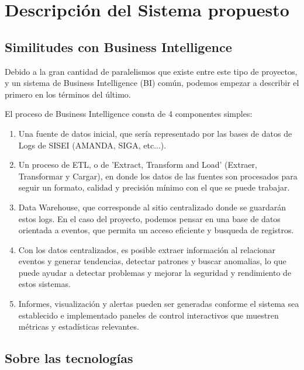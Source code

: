 \section{Descripción del Sistema propuesto}
\label{section:descripcion}

\subsection{Similitudes con Business Intelligence}

Debido a la gran cantidad de paralelismos que existe entre este tipo de proyectos, y un sistema de Business Intelligence (BI) común, podemos empezar a describir el primero en los términos del último.


El proceso de Business Intelligence consta de 4 componentes simples:

\begin{enumerate}
  \item Una fuente de datos inicial, que sería representado por las bases de datos de Logs de SISEI (AMANDA, SIGA, etc...).
  \item Un proceso de ETL, o de 'Extract, Transform and Load' (Extraer, Transformar y Cargar), en donde los datos de las fuentes son procesados para seguir un formato, calidad y precisión mínimo con el que se puede trabajar.
  \item Data Warehouse, que corresponde al sitio centralizado donde se guardarán estos logs. En el caso del proyecto, podemos pensar en una base de datos orientada a eventos, que permita un acceso eficiente y busqueda de registros.
  \item Con los datos centralizados, es posible extraer información al relacionar eventos y generar tendencias, detectar patrones y buscar anomalias, lo que puede ayudar a detectar problemas y mejorar la seguridad y rendimiento de estos sistemas.
  \item Informes, visualización y alertas pueden ser generadas conforme el sistema sea establecido e implementado paneles de control interactivos que muestren métricas y estadísticas relevantes.
\end{enumerate}

\subsection{Sobre las tecnologías}


